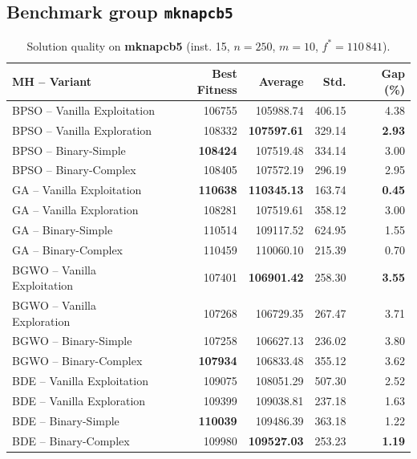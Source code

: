 \documentclass[journal,article,submit,moreauthors]{Definitions/mdpi}
\begin{document}
\clearpage
\subsection{Benchmark group \texttt{mknapcb5}}

\begin{table}[htbp]
  \centering
  \small
  \caption{Solution quality on \textbf{mknapcb5} (inst. 15, $n=250$, $m=10$, $f^*=110\,841$).}
  \label{tab:calidad_mknapcb5_15}
  \begin{tabular}{lrrrr}
    \toprule
    \textbf{MH -- Variant} &
    \textbf{Best Fitness} &
    \textbf{Average} &
    \textbf{Std.} &
    \textbf{Gap (\%)} \\
    \midrule
    BPSO -- Vanilla Exploitation &         106755 &        105988.74 & 406.15 &         4.38 \\
    BPSO -- Vanilla Exploration  &         108332 & \textbf{107597.61} & 329.14 & \textbf{2.93} \\
    BPSO -- Binary-Simple        & \textbf{108424} &        107519.48 & 334.14 &         3.00 \\
    BPSO -- Binary-Complex       &         108405 &        107572.19 & 296.19 &         2.95 \\
    \midrule
    GA -- Vanilla Exploitation   & \textbf{110638} & \textbf{110345.13} & 163.74 & \textbf{0.45} \\
    GA -- Vanilla Exploration    &         108281 &        107519.61 & 358.12 &         3.00 \\
    GA -- Binary-Simple          &         110514 &        109117.52 & 624.95 &         1.55 \\
    GA -- Binary-Complex         &         110459 &        110060.10 & 215.39 &         0.70 \\
    \midrule
    BGWO -- Vanilla Exploitation &         107401 & \textbf{106901.42} & 258.30 & \textbf{3.55} \\
    BGWO -- Vanilla Exploration  &         107268 &        106729.35 & 267.47 &         3.71 \\
    BGWO -- Binary-Simple        &         107258 &        106627.13 & 236.02 &         3.80 \\
    BGWO -- Binary-Complex       & \textbf{107934} &        106833.48 & 355.12 &         3.62 \\
    \midrule
    BDE -- Vanilla Exploitation  &         109075 &        108051.29 & 507.30 &         2.52 \\
    BDE -- Vanilla Exploration   &         109399 &        109038.81 & 237.18 &         1.63 \\
    BDE -- Binary-Simple         & \textbf{110039} &        109486.39 & 363.18 &         1.22 \\
    BDE -- Binary-Complex        &         109980 & \textbf{109527.03} & 253.23 & \textbf{1.19} \\
    \bottomrule
  \end{tabular}
\end{table}
\end{document}
